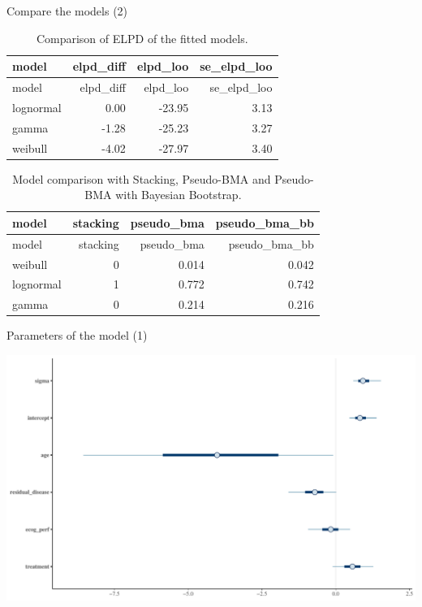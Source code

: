 \documentclass[ignorenonframetext,a4paper]{beamer}
\begin{document}
\begin{frame}{Compare the models (2)}

\scriptsize

\begin{longtable}[]{@{}lrrr@{}}
\caption{Comparison of ELPD of the fitted models.}\tabularnewline
\toprule
model & elpd\_diff & elpd\_loo & se\_elpd\_loo\tabularnewline
\midrule
\endfirsthead
\toprule
model & elpd\_diff & elpd\_loo & se\_elpd\_loo\tabularnewline
\midrule
\endhead
lognormal & 0.00 & -23.95 & 3.13\tabularnewline
gamma & -1.28 & -25.23 & 3.27\tabularnewline
weibull & -4.02 & -27.97 & 3.40\tabularnewline
\bottomrule
\end{longtable}

\begin{longtable}[]{@{}lrrr@{}}
\caption{Model comparison with Stacking, Pseudo-BMA and Pseudo-BMA with
Bayesian Bootstrap.}\tabularnewline
\toprule
model & stacking & pseudo\_bma & pseudo\_bma\_bb\tabularnewline
\midrule
\endfirsthead
\toprule
model & stacking & pseudo\_bma & pseudo\_bma\_bb\tabularnewline
\midrule
\endhead
weibull & 0 & 0.014 & 0.042\tabularnewline
lognormal & 1 & 0.772 & 0.742\tabularnewline
gamma & 0 & 0.214 & 0.216\tabularnewline
\bottomrule
\end{longtable}

\end{frame}

\begin{frame}{Parameters of the model (1)}

\includegraphics{DB_presentation_case_study_files/figure-beamer/unnamed-chunk-22-1.pdf}

\end{frame}
\end{document}
